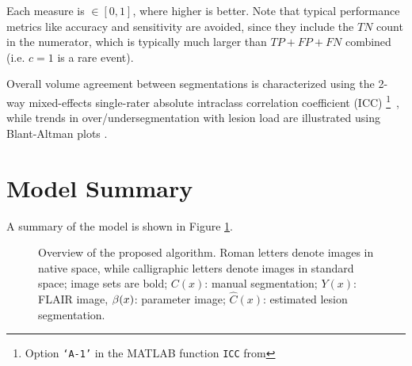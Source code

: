Each measure is $\in [0,1]$, where higher is better. Note that typical performance metrics like accuracy and sensitivity are avoided, since they include the $TN$ count in the numerator, which is typically much larger than $TP + FP + FN$ combined (i.e. $c=1$ is a rare event).
\par
Overall volume agreement between segmentations is characterized using the 2-way mixed-effects single-rater absolute intraclass correlation coefficient (ICC)%
\footnote{Option \texttt{`A-1'} in the MATLAB function \texttt{ICC} from }\ 
\cite{Koo2016}, while trends in over/undersegmentation with lesion load are illustrated using Blant-Altman plots \cite{Altman1983}.
\section{Model Summary}



A summary of the model is shown in Figure \ref{fig:modelsum}.
\begin{figure}
  \centering\scalebox{0.65}{}
  \caption{Overview of the proposed algorithm. Roman letters denote images in native space, while calligraphic letters denote images in standard space; image sets are bold; $C(x)$: manual segmentation; $Y(x)$: FLAIR image, $\beta(x)$: parameter image; $\hat{C}(x)$: estimated lesion segmentation.}
  \label{fig:modelsum}
\end{figure}
